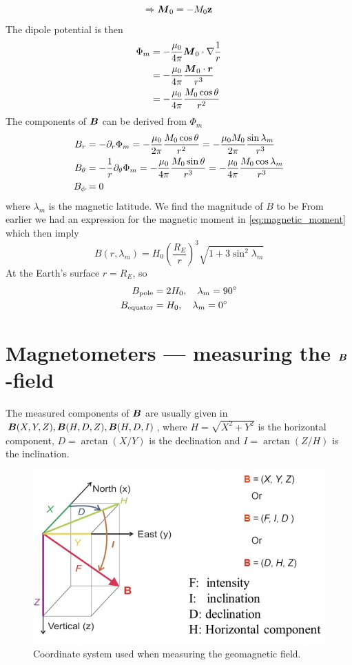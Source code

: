\begin{equation*}
    \Rightarrow \boldsymbol{M}_0=-M_0\mathbf{z}
\end{equation*}
The dipole potential is then
\begin{equation*}
    \begin{aligned}
        \Phi_m&=-\frac{\mu_0}{4\pi}\boldsymbol{M}_0\cdot\nabla\frac{1}{r}\\
        &=-\frac{\mu_0}{4\pi}\frac{\boldsymbol{M}_0\cdot\boldsymbol{r}}{r^3}\\
        &=-\frac{\mu_0}{4\pi}\frac{M_0\cos\theta}{r^2}
    \end{aligned}
\end{equation*}
The components of \(\boldsymbol{B}\) can be derived from \(\Phi_m\)
\begin{align*}
    B_r&=-\partial_{r}\Phi_m=-\frac{\mu_0}{2\pi}\frac{M_0\cos\theta}{r^2}=-\frac{\mu_0M_0}{2\pi}\frac{\sin\lambda_m}{r^3}\\
    B_\theta&=-\frac{1}{r}\partial_{\theta}\Phi_m=-\frac{\mu_0}{4\pi}\frac{M_0\sin\theta}{r^3}=-\frac{\mu_0}{4\pi}\frac{M_0\cos\lambda_m}{r^3}\\
    B_\phi&=0
\end{align*}
where \(\lambda_m\) is the magnetic latitude. We find the magnitude of \(B\) to be
From earlier we had an expression for the magnetic moment in \cref{eq:magnetic_moment} which then imply
\begin{equation*}
    B(r,\lambda_m)=H_0{\left(\frac{R_E}{r}\right)}^3\sqrt{1+3\sin^2\lambda_m}
\end{equation*}
At the Earth's surface \(r=R_E\), so
\begin{align*}
    B_{\textnormal{pole}}&=2H_0,\quad\lambda_m=90^\circ \\
    B_{\textnormal{equator}}&=H_0,\quad\lambda_m=0^\circ
\end{align*}

\section{Magnetometers --- measuring the \(\boldsymbol{B}\)-field}
The measured components of \(\boldsymbol{B}\) are usually given in \(\boldsymbol{B}(X,Y,Z), \boldsymbol{B}(H,D,Z), \boldsymbol{B}(H,D,I)\), where \(H=\sqrt{X^2+Y^2}\) is the horizontal component, \(D=\arctan(X/Y)\) is the declination and \(I=\arctan(Z/H)\) is the inclination.
\begin{figure}[ht]
    \centering
    \includegraphics[width=.45\linewidth]{bilder/magnetometer_coor.png}
    \caption{Coordinate system used when measuring the geomagnetic field.}\label{fig:magnetometer_coor}
\end{figure}


